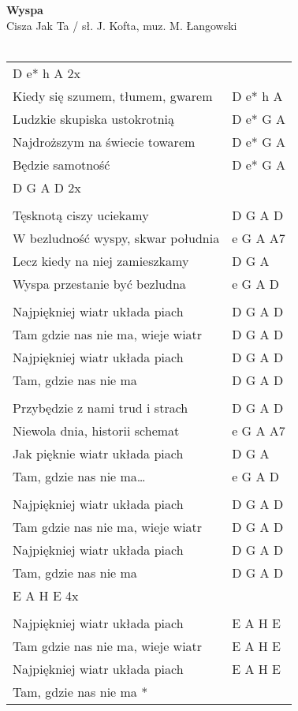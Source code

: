 \documentclass[a5paper]{article}
\begin{document}


\noindent
\fontsize{12pt}{15pt}\selectfont
\textbf{Wyspa} \\
\fontsize{8pt}{10pt}\selectfont
Cisza Jak Ta / sł. J. Kofta, muz. M. Łangowski \\ \\
\fontsize{10pt}{12pt}\selectfont
{}
\begin{tabular}{@{}p{8.00cm}p{3cm}@{}}
\noindent
D e* h A 2x & \\
Kiedy się szumem, tłumem, gwarem & D e* h A \\
Ludzkie skupiska ustokrotnią & D e* G A \\
Najdroższym na świecie towarem & D e* G A \\
Będzie samotność & D e* G A \\
D G A D 2x \\ \\

Tęsknotą ciszy uciekamy & D G A D \\
W bezludność wyspy, skwar południa & e G A A7 \\
Lecz kiedy na niej zamieszkamy & D G A \\
Wyspa przestanie być bezludna & e G A D \\ \\

Najpiękniej wiatr układa piach & D G A D \\
Tam gdzie nas nie ma, wieje wiatr & D G A D \\
Najpiękniej wiatr układa piach & D G A D \\
Tam, gdzie nas nie ma & D G A D \\ \\

Przybędzie z nami trud i strach & D G A D \\
Niewola dnia, historii schemat & e G A A7 \\
Jak pięknie wiatr układa piach & D G A \\
Tam, gdzie nas nie ma… & e G A D \\ \\

Najpiękniej wiatr układa piach & D G A D \\
Tam gdzie nas nie ma, wieje wiatr & D G A D \\
Najpiękniej wiatr układa piach & D G A D \\
Tam, gdzie nas nie ma & D G A D \\
E A H E 4x & \\ \\

Najpiękniej wiatr układa piach & E A H E \\
Tam gdzie nas nie ma, wieje wiatr & E A H E \\
Najpiękniej wiatr układa piach & E A H E \\
Tam, gdzie nas nie ma *
\end{tabular}
\end{document}
